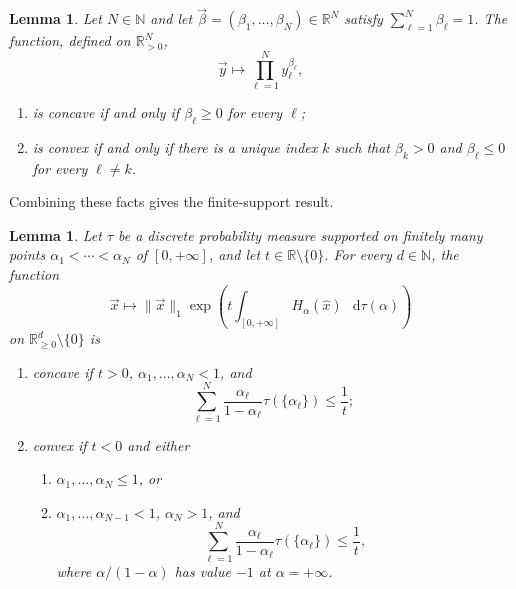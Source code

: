 \documentclass[11pt]{article}
\newtheorem{lemma}[theorem]{Lemma}
\theoremstyle{definition}
\newcommand{\mb}[1]{\mathbb{#1}}
\newcommand{\R}{\mathbb{R}}
\def\d{\mathop{}\!\mathrm{d}}
\begin{document}
\begin{lemma}
\label{lem:Matrix-majorization}
Let $N\in\mb{N}$ and let
$\vec{\beta}=(\beta_1,\ldots,\beta_N)\in\R^N$ satisfy
$\sum_{\ell=1}^N\beta_\ell=1$.  The function, defined on
$\R^N_{>0}$,
\begin{equation}
\vec{y}\longmapsto\prod_{\ell=1}^N y_\ell^{\beta_\ell},
\end{equation}
\begin{enumerate}[itemsep=1pt]
\item is concave if and only if $\beta_\ell\geq0$ for every $\ell$;
\item is convex if and only if there is a unique index $k$ such that
$\beta_k>0$ and $\beta_\ell\leq0$ for every $\ell\neq k$.
\end{enumerate}
\end{lemma}

Combining these facts gives the finite-support result.

\begin{lemma}
\label{lem:discrete-measure}
Let $\tau$ be a discrete probability measure supported on finitely many points
$\alpha_1<\cdots<\alpha_N$ of $[0,+\infty]$, and let
$t\in\R\setminus\{0\}$.  For every $d\in\mb{N}$, the function
\begin{equation}
\vec{x}\longmapsto\|\vec{x}\|_1
\exp\!\left(t\int_{[0,+\infty]}H_\alpha(\hat{x})\,
\d\tau(\alpha)\right)
\end{equation}
on $\R^d_{\geq0}\setminus\{0\}$ is
\begin{enumerate}
\item concave if $t>0$, $\alpha_1,\ldots,\alpha_N<1$, and
\begin{equation}
\sum_{\ell=1}^N\frac{\alpha_\ell}{1-\alpha_\ell}
\tau(\{\alpha_\ell\})\leq\frac1t;
\end{equation}
\item convex if $t<0$ and either
  \begin{enumerate}[label=(\alph*)]
  \item $\alpha_1,\ldots,\alpha_N\leq1$, or
  \item $\alpha_1,\ldots,\alpha_{N-1}<1$, $\alpha_N>1$, and
  \begin{equation}
  \sum_{\ell=1}^N\frac{\alpha_\ell}{1-\alpha_\ell}
  \tau(\{\alpha_\ell\})\leq\frac1t,
  \end{equation}
  where $\alpha/(1-\alpha)$ has value $-1$ at $\alpha=+\infty$.
  \end{enumerate}
\end{enumerate}
\end{lemma}
\end{document}

